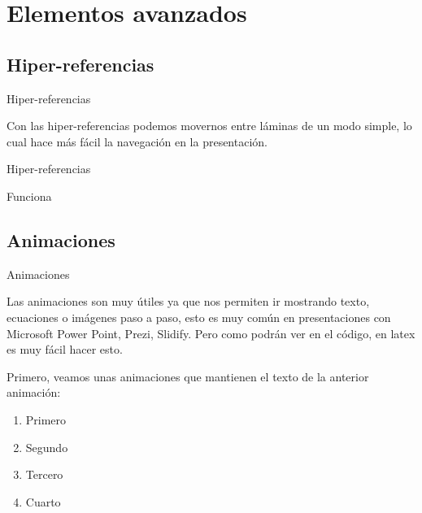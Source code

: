 \documentclass[a4paper,10pt]{beamer}
\begin{document}
\section{Elementos avanzados}
\subsection{Hiper-referencias}

\begin{frame}[label=milink1]{Hiper-referencias}
 
 Con las hiper-referencias podemos movernos entre l\'aminas
 de un modo simple, lo cual hace m\'as f\'acil la 
 navegaci\'on en la presentaci\'on.
 
 \vspace{0.4cm}
 
 \hyperlink{milink2}{}
\end{frame}

\begin{frame}[label=milink2]{Hiper-referencias}
 
 Funciona \Smiley{}
 
  \vspace{0.4cm}
 
 \hyperlink{milink1}{}
\end{frame}

\subsection{Animaciones}
\begin{frame}{Animaciones}
 
 Las animaciones son muy \'utiles ya que nos permiten
 ir mostrando texto, ecuaciones o im\'agenes paso a paso,
 esto es muy com\'un en presentaciones con Microsoft Power Point,
 Prezi, Slidify. Pero como podr\'an ver en el c\'odigo, en latex
 es muy f\'acil hacer esto.
 
 \vspace{.3cm}
 
 Primero, veamos unas animaciones que mantienen el texto de
 la anterior animaci\'on:
 

 \begin{enumerate} [<+->]
  \item Primero
  \item Segundo
  \item Tercero
  \item Cuarto
 \end{enumerate}
 
 \end{frame}
\end{document}
